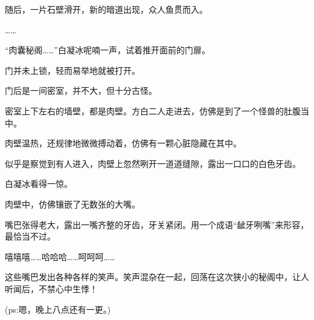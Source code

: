 \begin{this_body}
随后，一片石壁滑开，新的暗道出现，众人鱼贯而入。

……

“肉囊秘阁……”白凝冰呢喃一声，试着推开面前的门扉。

门并未上锁，轻而易举地就被打开。

门后是一间密室，并不大，但十分古怪。

密室上下左右的墙壁，都是肉壁。方白二人走进去，仿佛是到了一个怪兽的肚腹当中。

肉壁温热，还规律地微微搏动着，仿佛有一颗心脏隐藏在其中。

似乎是察觉到有人进入，肉壁上忽然咧开一道道缝隙，露出一口口的白色牙齿。

白凝冰看得一惊。

肉壁中，仿佛镶嵌了无数张的大嘴。

嘴巴张得老大，露出一嘴齐整的牙齿，牙关紧闭。用一个成语“龇牙咧嘴”来形容，最恰当不过。

嘻嘻嘻……哈哈哈……呵呵呵……

这些嘴巴发出各种各样的笑声。笑声混杂在一起，回荡在这次狭小的秘阁中，让人听闻后，不禁心中生悸！

(ps:嗯，晚上八点还有一更。)

\end{this_body}

